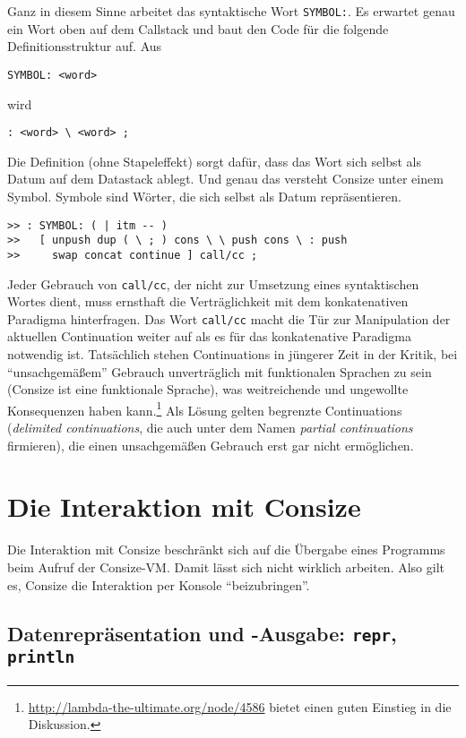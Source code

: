 Ganz in diesem Sinne arbeitet das syntaktische Wort \verb|SYMBOL:|. Es erwartet genau ein Wort oben auf dem Callstack und baut den Code für die folgende Definitionsstruktur auf. Aus

\begin{verbatim}
SYMBOL: <word>
\end{verbatim}

wird

\begin{verbatim}
: <word> \ <word> ;
\end{verbatim}

Die Definition (ohne Stapeleffekt) sorgt dafür, dass das Wort sich selbst als Datum auf dem Datastack ablegt. Und genau das versteht Consize unter einem Symbol. Symbole sind Wörter, die sich selbst als Datum repräsentieren.

\begin{verbatim}
>> : SYMBOL: ( | itm -- )
>>   [ unpush dup ( \ ; ) cons \ \ push cons \ : push
>>     swap concat continue ] call/cc ;
\end{verbatim}

Jeder Gebrauch von \verb|call/cc|, der nicht zur Umsetzung eines syntaktischen Wortes dient, muss ernsthaft die Verträglichkeit mit dem konkatenativen Paradigma hinterfragen. Das Wort \verb|call/cc| macht die Tür zur Manipulation der aktuellen Continuation weiter auf als es für das konkatenative Paradigma notwendig ist. Tatsächlich stehen Continuations in jüngerer Zeit in der Kritik, bei "`unsachgemäßem"' Gebrauch unverträglich mit funktionalen Sprachen zu sein (Consize ist eine funktionale Sprache), was weitreichende und ungewollte Konsequenzen haben kann.\footnote{\url{http://lambda-the-ultimate.org/node/4586} bietet einen guten Einstieg in die Diskussion.} Als Lösung gelten begrenzte Continuations (\emph{delimited continuations}, die auch unter dem Namen \emph{partial continuations} firmieren), die einen unsachgemäßen Gebrauch erst gar nicht ermöglichen.

\section{Die Interaktion mit Consize}

Die Interaktion mit Consize beschränkt sich auf die Übergabe eines Programms beim Aufruf der Consize-VM. Damit lässt sich nicht wirklich arbeiten. Also gilt es, Consize die Interaktion per Konsole "`beizubringen"'.

\subsection{Datenrepräsentation und -Ausgabe: \texttt{repr}, \texttt{println}}

